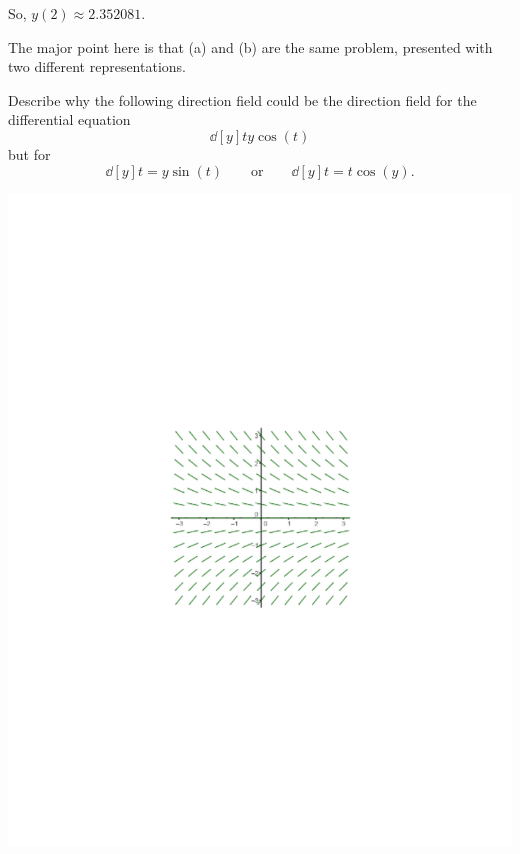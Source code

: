 \documentclass[]{ximera}
\begin{document}
\begin{problem}
\begin{enumerate}
\begin{freeResponse}
	So, $y(2) \approx 2.352081$.
	\end{freeResponse}
	\end{enumerate}
	
\end{problem}

\begin{instructorNotes}
The major point here is that (a) and (b) are the same problem, presented with two different representations.
\end{instructorNotes}







\begin{problem}
Describe why the following direction field could be the direction field for the differential equation 
	\[
	\dd[y]{t} y \cos(t)
	\]
but  for 
	\[
	\dd[y]{t} = y \sin(t) 	\qquad	\text{or}	\qquad	\dd[y]{t} = t \cos(y).
	\]
	
	\begin{image}
	\includegraphics[trim= 300 280 250 280,scale=0.8]{Figure8-2-2.pdf}
	\end{image}
	\begin{freeResponse}
		

\end{freeResponse}
\end{problem}
\end{document}
